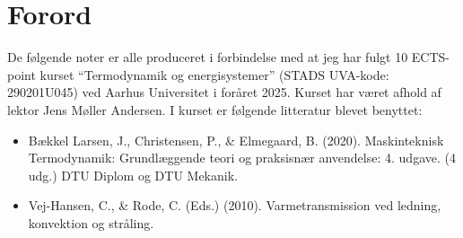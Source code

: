 \section{Forord}
De følgende noter er alle produceret i forbindelse med at jeg har fulgt 10 ECTS-point kurset ``Termodynamik og energisystemer'' (STADS UVA-kode: 290201U045) ved Aarhus Universitet i foråret 2025. Kurset har været afhold af lektor Jens Møller Andersen. I kurset er følgende litteratur blevet benyttet:
\begin{itemize}
  \item Bækkel Larsen, J., Christensen, P., \& Elmegaard, B. (2020). Maskinteknisk Termodynamik: Grundlæggende
teori og praksisnær anvendelse: 4. udgave. (4 udg.) DTU Diplom og DTU Mekanik.
  \item Vej-Hansen, C., \& Rode, C. (Eds.) (2010). Varmetransmission ved ledning, konvektion og stråling.
\end{itemize}
